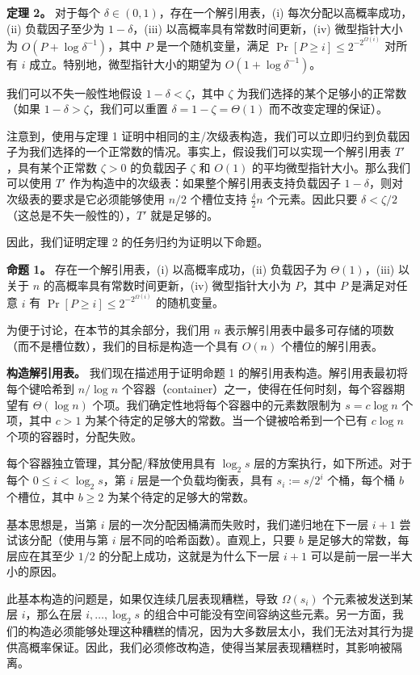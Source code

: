 \documentclass[12pt,a4paper]{ctexart}
\theoremstyle{remark}
\begin{document}
\textbf{定理 2。} 对于每个 $\delta\in(0,1)$，存在一个解引用表，(i) 每次分配以高概率成功，(ii) 负载因子至少为 $1-\delta$，(iii) 以高概率具有常数时间更新，(iv) 微型指针大小为 $O(P+\log\delta^{-1})$，其中 $P$ 是一个随机变量，满足 $\Pr[P\geq i]\leq 2^{-2^{\Omega(i)}}$ 对所有 $i$ 成立。特别地，微型指针大小的期望为 $O(1+\log\delta^{-1})$。

我们可以不失一般性地假设 $1-\delta<\zeta$，其中 $\zeta$ 为我们选择的某个足够小的正常数（如果 $1-\delta>\zeta$，我们可以重置 $\delta=1-\zeta=\Theta(1)$ 而不改变定理的保证）。

注意到，使用与定理 1 证明中相同的主/次级表构造，我们可以立即归约到负载因子为我们选择的一个正常数的情况。事实上，假设我们可以实现一个解引用表 $T'$，具有某个正常数 $\zeta>0$ 的负载因子 $\zeta$ 和 $O(1)$ 的平均微型指针大小。那么我们可以使用 $T'$ 作为构造中的次级表：如果整个解引用表支持负载因子 $1-\delta$，则对次级表的要求是它必须能够使用 $n/2$ 个槽位支持 $\frac{\delta}{2}n$ 个元素。因此只要 $\delta<\zeta/2$（这总是不失一般性的），$T'$ 就是足够的。

因此，我们证明定理 2 的任务归约为证明以下命题。

\textbf{命题 1。} 存在一个解引用表，(i) 以高概率成功，(ii) 负载因子为 $\Theta(1)$，(iii) 以关于 $n$ 的高概率具有常数时间更新，(iv) 微型指针大小为 $P$，其中 $P$ 是满足对任意 $i$ 有 $\Pr[P\geq i]\leq 2^{-2^{\Omega(i)}}$ 的随机变量。

为便于讨论，在本节的其余部分，我们用 $n$ 表示解引用表中最多可存储的项数（而不是槽位数），我们的目标是构造一个具有 $O(n)$ 个槽位的解引用表。

\textbf{构造解引用表。} 我们现在描述用于证明命题 1 的解引用表构造。解引用表最初将每个键哈希到 $n/\log n$ 个容器（container）之一，使得在任何时刻，每个容器期望有 $\Theta(\log n)$ 个项。我们确定性地将每个容器中的元素数限制为 $s=c\log n$ 个项，其中 $c>1$ 为某个待定的足够大的常数。当一个键被哈希到一个已有 $c\log n$ 个项的容器时，分配失败。

每个容器独立管理，其分配/释放使用具有 $\log_2 s$ 层的方案执行，如下所述。对于每个 $0\leq i<\log_2 s$，第 $i$ 层是一个负载均衡表，具有 $s_i:=s/2^i$ 个桶，每个桶 $b$ 个槽位，其中 $b\geq 2$ 为某个待定的足够大的常数。

基本思想是，当第 $i$ 层的一次分配因桶满而失败时，我们递归地在下一层 $i+1$ 尝试该分配（使用与第 $i$ 层不同的哈希函数）。直观上，只要 $b$ 是足够大的常数，每层应在其至少 $1/2$ 的分配上成功，这就是为什么下一层 $i+1$ 可以是前一层一半大小的原因。

此基本构造的问题是，如果仅连续几层表现糟糕，导致 $\Omega(s_i)$ 个元素被发送到某层 $i$，那么在层 $i,\ldots,\log_2 s$ 的组合中可能没有空间容纳这些元素。另一方面，我们的构造必须能够处理这种糟糕的情况，因为大多数层太小，我们无法对其行为提供高概率保证。因此，我们必须修改构造，使得当某层表现糟糕时，其影响被隔离。
\end{document}
